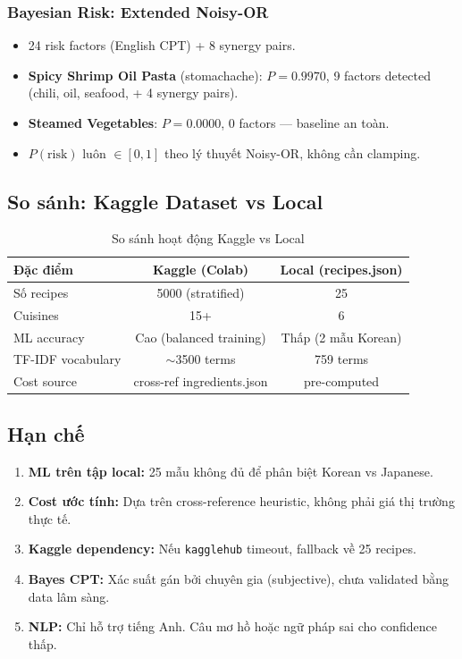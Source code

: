 \subsubsection{Bayesian Risk: Extended Noisy-OR}
\begin{itemize}
  \item 24 risk factors (English CPT) + 8 synergy pairs.
  \item \textbf{Spicy Shrimp Oil Pasta} (stomachache): $P = 0.9970$, 9 factors detected (chili, oil, seafood, + 4 synergy pairs).
  \item \textbf{Steamed Vegetables}: $P = 0.0000$, 0 factors --- baseline an toàn.
  \item $P(\text{risk})$ luôn $\in [0, 1]$ theo lý thuyết Noisy-OR, không cần clamping.
\end{itemize}

\subsection{So sánh: Kaggle Dataset vs Local}

\begin{table}[H]
\centering
\begin{tabular}{|l|c|c|}
\hline
\textbf{Đặc điểm} & \textbf{Kaggle (Colab)} & \textbf{Local (recipes.json)} \\
\hline
Số recipes & 5000 (stratified) & 25 \\
\hline
Cuisines & 15+ & 6 \\
\hline
ML accuracy & Cao (balanced training) & Thấp (2 mẫu Korean) \\
\hline
TF-IDF vocabulary & $\sim$3500 terms & 759 terms \\
\hline
Cost source & cross-ref ingredients.json & pre-computed \\
\hline
\end{tabular}
\caption{So sánh hoạt động Kaggle vs Local}
\end{table}

\subsection{Hạn chế}

\begin{enumerate}
  \item \textbf{ML trên tập local:} 25 mẫu không đủ để phân biệt Korean vs Japanese.
  \item \textbf{Cost ước tính:} Dựa trên cross-reference heuristic, không phải giá thị trường thực tế.
  \item \textbf{Kaggle dependency:} Nếu \texttt{kagglehub} timeout, fallback về 25 recipes.
  \item \textbf{Bayes CPT:} Xác suất gán bởi chuyên gia (subjective), chưa validated bằng data lâm sàng.
  \item \textbf{NLP:} Chỉ hỗ trợ tiếng Anh. Câu mơ hồ hoặc ngữ pháp sai cho confidence thấp.
\end{enumerate}

